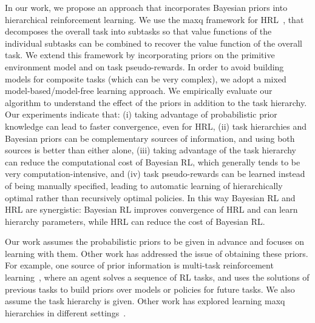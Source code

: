 In our work, we propose an approach that incorporates Bayesian priors
into hierarchical reinforcement learning. We use the {\sc maxq} framework
for HRL~\cite{d-hrl-00}, that 
decomposes the overall task into subtasks so that value functions of
the individual subtasks can be combined to recover the value function
of the overall task. We extend this framework by incorporating priors
on the primitive environment model and on task pseudo-rewards. In
order to avoid building models for composite tasks (which can be very
complex), we adopt a mixed model-based/model-free learning approach.
We empirically evaluate our algorithm to understand the effect of the
priors in addition to the task hierarchy. Our experiments indicate
that: (i) taking advantage of probabilistic prior knowledge can lead
to faster convergence, even for HRL, (ii) task hierarchies and
Bayesian priors can be complementary sources of information, and using
both sources is better than either alone, (iii) taking advantage of
the task hierarchy can reduce the computational cost of Bayesian RL,
which generally tends to be very computation-intensive, and (iv) task
pseudo-rewards can be learned instead of being manually specified,
leading to automatic learning of hierarchically optimal rather than
recursively optimal policies.  In this way Bayesian RL and HRL are
synergistic: Bayesian RL improves convergence of HRL and can
 learn hierarchy parameters, while HRL can reduce the cost
of Bayesian RL.

Our work assumes the probabilistic priors to be given in
advance and focuses on learning with them. Other work has addressed
the issue of obtaining these priors. For example, one source of prior
information is multi-task reinforcement
learning~\cite{Lazaric_bayesianmulti-task, icml2007}, where an
agent solves a sequence of RL tasks, and uses the solutions of
previous tasks to build priors over models or policies for future
tasks. We also assume the task hierarchy is given. Other work has
explored learning {\sc maxq} hierarchies in different settings~\cite{mehta.icml08}.